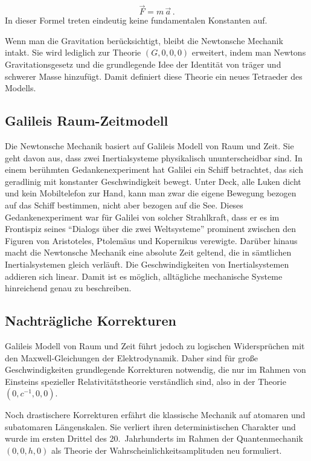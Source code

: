 \begin{equation*}
  \vec{F} =m\, \vec{a}\,.
\end{equation*}
%
In dieser Formel treten eindeutig keine fundamentalen Konstanten auf.

Wenn man die Gravitation berücksichtigt, bleibt die Newtonsche Mechanik intakt. Sie wird lediglich zur Theorie $(G,0,0,0)$ erweitert, indem man Newtons Gravitationsgesetz und die grundlegende Idee der Identität von träger und schwerer Masse hinzufügt. Damit definiert diese Theorie ein neues Tetraeder des Modells.


\subsection*{Galileis Raum-Zeitmodell}

Die Newtonsche Mechanik basiert auf Galileis Modell von Raum und Zeit. Sie geht davon aus, dass zwei Inertialsysteme physikalisch ununterscheidbar sind. In einem berühmten Gedankenexperiment hat Galilei ein Schiff betrachtet, das sich geradlinig mit konstanter Geschwindigkeit bewegt. Unter Deck, alle Luken dicht und kein Mobiltelefon zur Hand, kann man zwar die eigene Bewegung bezogen auf das Schiff bestimmen, nicht aber bezogen auf die See. Dieses Gedankenexperiment war für Galilei von solcher Strahlkraft, dass er es im Frontispiz seines \enquote{Dialogs über die zwei Weltsysteme} prominent zwischen den Figuren von Aristoteles, Ptolemäus und Kopernikus verewigte. Darüber hinaus macht die Newtonsche Mechanik eine absolute Zeit geltend, die in sämtlichen Inertialsystemen gleich verläuft. Die Geschwindigkeiten von Inertialsystemen addieren sich linear. Damit ist es möglich, alltägliche mechanische Systeme hinreichend genau zu beschreiben.


\subsection*{Nachträgliche Korrekturen}

Galileis Modell von Raum und Zeit führt jedoch zu logischen Widersprüchen mit den Maxwell-Gleichungen der Elektrodynamik. Daher sind für große Geschwindigkeiten grundlegende Korrekturen notwendig, die nur im Rahmen von Einsteins spezieller Relativitätstheorie verständlich sind, also in der Theorie $(0,c^{-1},0,0)$.

Noch drastischere Korrekturen erfährt die klassische Mechanik auf atomaren und subatomaren Längenskalen. Sie verliert ihren deterministischen Charakter und wurde im ersten Drittel des 20.\ Jahrhunderts im Rahmen der Quantenmechanik $(0,0,h,0)$ als Theorie der Wahrscheinlichkeitsamplituden neu formuliert.

